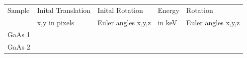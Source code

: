 \begin{table}[]
	\begin{tabular}{lllll}
		\hline
		Sample & Inital Translation & Inital Rotation    & Energy & Rotation           \\
		& x,y in pixels      & Euler angles x,y,z & in keV    & Euler angles x,y,z \\
		\hline
		GaAs 1 &                    &                    &        &                    \\
		GaAs 2 &                    &                    &        &                   \\
		\hline
	\end{tabular}
\label{tab:kosselfit}
\end{table}
